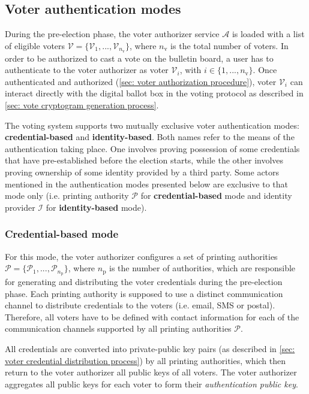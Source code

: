 \subsection{Voter authentication modes} \label{sec: voter authentication modes}
During the pre-election phase, the voter authorizer service $\mathcal{A}$ is loaded with a list of eligible voters $\boldsymbol{\mathcal{V}} = \{ \mathcal{V}_1, ..., \mathcal{V}_{n_\mathrm{v}} \}$, where $n_\mathrm{v}$ is the total number of voters. In order to be authorized to cast a vote on the bulletin board, a user has to authenticate to the voter authorizer as voter $\mathcal{V}_i$, with $i \in \{ 1, ..., n_\mathrm{v} \}$. Once authenticated and authorized (\cref{sec: voter authorization procedure}), voter $\mathcal{V}_i$ can interact directly with the digital ballot box in the voting protocol as described in \cref{sec: vote cryptogram generation process}.

The voting system supports two mutually exclusive voter authentication modes: \textbf{credential-based} and \textbf{identity-based}. Both names refer to the means of the authentication taking place. One involves proving possession of some credentials that have pre-established before the election starts, while the other involves proving ownership of some identity provided by a third party. Some actors mentioned in the authentication modes presented below are exclusive to that mode only (i.e. printing authority $\mathcal{P}$ for \textbf{credential-based} mode and identity provider $\mathcal{I}$ for \textbf{identity-based} mode).


\subsubsection{Credential-based mode} \label{sec: credential-based mode}
For this mode, the voter authorizer configures a set of printing authorities $\boldsymbol{\mathcal{P}} = \{\mathcal{P}_1, ..., \mathcal{P}_{n_\mathrm{p}}\}$, where $n_\mathrm{p}$ is the number of authorities, which are responsible for generating and distributing the voter credentials during the pre-election phase. Each printing authority is supposed to use a distinct communication channel to distribute credentials to the voters (i.e. email, SMS or postal). Therefore, all voters have to be defined with contact information for each of the communication channels supported by all printing authorities $\boldsymbol{\mathcal{P}}$.

All credentials are converted into private-public key pairs (as described in \cref{sec: voter credential distribution process}) by all printing authorities, which then return to the voter authorizer all public keys of all voters. The voter authorizer aggregates all public keys for each voter to form their \textit{authentication public key}. 


